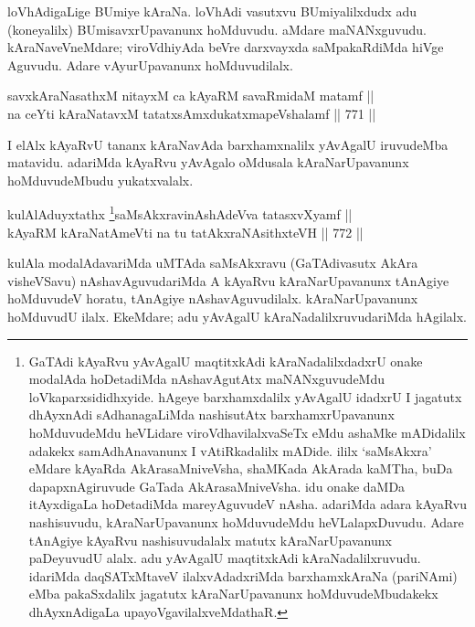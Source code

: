 \begin{artha} 
loVhAdigaLige BUmiye kAraNa. loVhAdi vasutxvu BUmiyalilxdudx adu (koneyalilx) BUmisavxrUpavanunx hoMduvudu. aMdare maNANxguvudu. kAraNaveVneMdare; viroVdhiyAda beVre darxvayxda saMpakaRdiMda hiVge Aguvudu. Adare vAyurUpavanunx hoMduvudilalx.
\end{artha}


\begin{shl}
savxkAraNasathxM nitayxM ca kAyaRM savaRmidaM matamf || \\
na ceYti kAraNatavxM tatatxsAmxdukatxmapeVshalamf \hfill || 771 ||  
\end{shl}

\begin{artha} 
I elAlx kAyaRvU tananx kAraNavAda barxhamxnalilx yAvAgalU iruvudeMba 
matavidu. adariMda kAyaRvu yAvAgalo oMdusala kAraNarUpavanunx 
hoMduvudeMbudu yukatxvalalx.
\end{artha}


\begin{shl}
kulAlAduyxtathx \footnote{GaTAdi kAyaRvu yAvAgalU maqtitxkAdi kAraNadalilxdadxrU 
onake modalAda hoDetadiMda nAshavAgutAtx maNANxguvudeMdu 
loVkaparxsididhxyide. hAgeye barxhamxdalilx yAvAgalU idadxrU I 
jagatutx dhAyxnAdi sAdhanagaLiMda nashisutAtx barxhamxrUpavanunx 
hoMduvudeMdu heVLidare viroVdhavilalxvaSeTx eMdu \ndash  ashaMke mADidalilx 
adakekx samAdhAnavanunx I vAtiRkadalilx mADide. ililx `saMsAkxra' 
eMdare kAyaRda AkArasaMniveVsha, shaMKada AkArada kaMTha, buDa 
dapapxnAgiruvude GaTada AkArasaMniveVsha. idu onake daMDa itAyxdigaLa 
hoDetadiMda mareyAguvudeV nAsha. adariMda adara kAyaRvu nashisuvudu, 
kAraNarUpavanunx hoMduvudeMdu heVLalapxDuvudu. Adare tAnAgiye kAyaRvu 
nashisuvudalalx matutx kAraNarUpavanunx paDeyuvudU alalx. adu yAvAgalU 
maqtitxkAdi kAraNadalilxruvudu. idariMda daqSATxMtaveV 
ilalxvAdadxriMda barxhamxkAraNa (pariNAmi) eMba pakaSxdalilx jagatutx 
kAraNarUpavanunx hoMduvudeMbudakekx dhAyxnAdigaLa 
upayoVgavilalxveMdathaR.}saMsAkxravinAshAdeVva tatasxvXyamf || \\
kAyaRM kAraNatAmeVti na tu tatAkxraNAsithxteVH \hfill || 772 ||  
\end{shl}

\begin{artha} 
kulAla modalAdavariMda uMTAda saMsAkxravu (GaTAdivasutx AkAra 
visheVSavu) nAshavAguvudariMda A kAyaRvu kAraNarUpavanunx tAnAgiye 
hoMduvudeV horatu, tAnAgiye nAshavAguvudilalx. kAraNarUpavanunx 
hoMduvudU ilalx. EkeMdare; adu yAvAgalU kAraNadalilxruvudariMda 
hAgilalx.
\end{artha}

